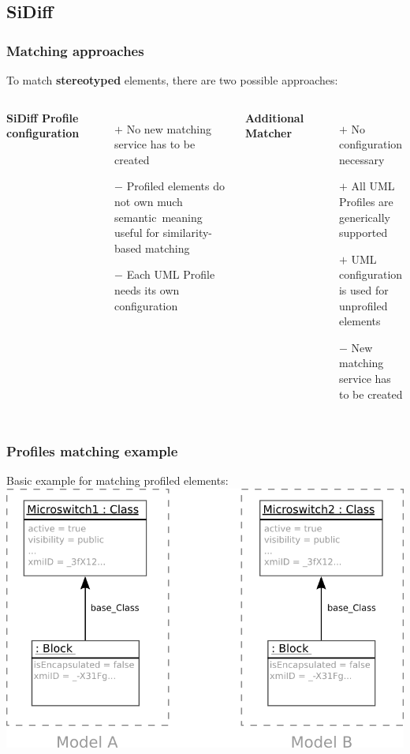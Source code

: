 \documentclass[10pt]{beamer}
\begin{document}
\subsection{SiDiff}
\begin{frame}
\frametitle{Matching approaches}
To match \textbf{stereotyped} elements, there are two possible approaches:
\medskip
\begin{columns}[t]
 \textbf{SiDiff Profile configuration}
\begin{itemize}
  \item[$+$] No new matching service has to be created
  \item[$-$] Profiled elements do not own much \glqq semantic\grqq\ meaning
  useful for similarity-based matching
  \item[$-$] Each UML Profile needs its own configuration
\end{itemize}
 \textbf{Additional Matcher}
\begin{itemize}
 \item[$+$] No configuration necessary
 \item[$+$] All UML Profiles are generically supported
 \item[$+$] UML configuration is used for unprofiled elements
 \item[$-$] New matching service has to be created
\end{itemize}
\end{columns}
\end{frame}
\begin{frame}
\frametitle{Profiles matching example}
\begin{center}
Basic example for matching profiled elements: \\
\medskip
\includegraphics[scale=0.8]{profilematcher_example1}\\
\end{center}

\end{frame}
\end{document}
